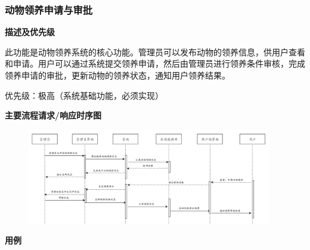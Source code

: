 \documentclass[12pt,a4paper,UTF8]{article}
\begin{document}
\subsubsection{动物领养申请与审批}

\noindent\textbf{描述及优先级}

此功能是动物领养系统的核心功能。管理员可以发布动物的领养信息，供用户查看和申请。用户可以通过系统提交领养申请，然后由管理员进行领养条件审核，完成领养申请的审批，更新动物的领养状态，通知用户领养结果。

优先级：极高（系统基础功能，必须实现）

\noindent\textbf{主要流程请求/响应时序图}

\begin{figure}[H]
  \centering
  \includegraphics[width=0.95\textwidth]{figures/use325.png} 
\end{figure}

\noindent\textbf{用例}
\end{document}
